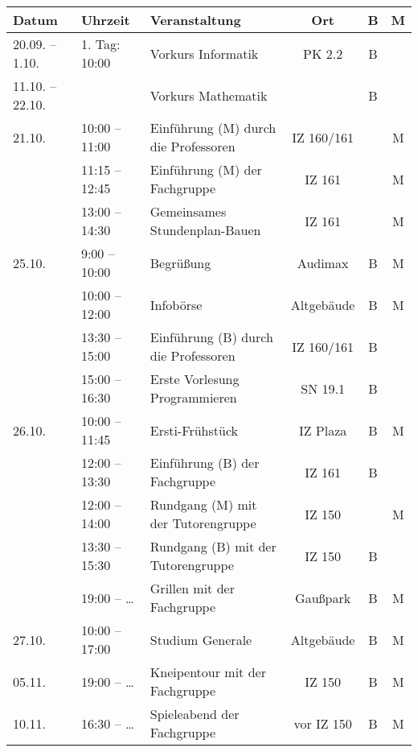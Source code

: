 
\begin{tabular}{|l|l|p{6.7cm}|c|c|c|}
\hline \textbf{Datum} & \textbf{Uhrzeit} & \textbf{Veranstaltung}	& \textbf{Ort} & \textbf{B} & \textbf{M} \\
\hline 20.09. – 1.10.	& 1. Tag: 10:00	 & Vorkurs Informatik						& PK 2.2		&B& \\
\hline 11.10. – 22.10. 	&		 & Vorkurs Mathematik 								&				&B& \\
\hline 21.10.	& 10:00 – 11:00	 & Einführung (M) \newline durch die Professoren	& IZ 160/161	& &M\\
\hline 			& 11:15 – 12:45	 & Einführung (M) der Fachgruppe					& IZ 161		& &M\\
\hline 			& 13:00 – 14:30	 & Gemeinsames Stundenplan-Bauen					& IZ 161		& &M\\
\hline 25.10.	&  9:00 – 10:00	 & Begrüßung										& Audimax		&B&M\\ %
\hline 			& 10:00 – 12:00	 & Infobörse										& Altgebäude	&B&M\\
\hline 			& 13:30 – 15:00	 & Einführung (B) \newline durch die Professoren	& IZ 160/161	&B& \\
\hline 			& 15:00 – 16:30	 & Erste Vorlesung Programmieren					& SN 19.1		&B& \\
\hline 26.10.	& 10:00 – 11:45	 & Ersti-Frühstück									& IZ Plaza		&B&M\\
\hline 			& 12:00 – 13:30	 & Einführung (B) der Fachgruppe					& IZ 161		&B& \\
\hline 			& 12:00 – 14:00	 & Rundgang (M) \newline mit der Tutorengruppe		& IZ 150		& &M\\
\hline 			& 13:30 – 15:30	 & Rundgang (B) \newline mit der Tutorengruppe		& IZ 150		&B& \\
\hline 			& 19:00 – \ldots & Grillen mit der Fachgruppe						& Gaußpark		&B&M\\
\hline 27.10.	& 10:00 – 17:00	 & Studium Generale									& Altgebäude	&B&M\\
\hline 05.11.	& 19:00 – \ldots & Kneipentour mit der Fachgruppe					& IZ 150		&B&M\\
\hline 10.11.	& 16:30 – \ldots & Spieleabend der Fachgruppe						& vor IZ 150	&B&M\\ 
\hline
\end{tabular} 
